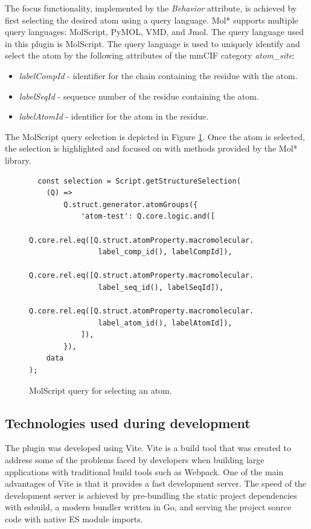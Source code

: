 \documentclass[
  digital,     %
  oneside,     %
  nosansbold,  %
  nocolorbold, %
  lof,         %
  lot,         %
]{fithesis4}
\begin{document}
The focus functionality, implemented by the \textit{Behavior} attribute, is achieved by first selecting the desired atom using a query language. Mol* supports multiple query languages: MolScript, PyMOL, VMD, and Jmol. The query language used in this plugin is MolScript. The query language is used to uniquely identify and select the atom by the following attributes of the mmCIF category \textit{atom\_site}:

\begin{itemize}
  \item \textit{labelCompId} - identifier for the chain containing the residue with the atom.
  \item \textit{labelSeqId} - sequence number of the residue containing the atom.
  \item \textit{labelAtomId} - identifier for the atom in the residue.
\end{itemize}

The MolScript query selection is depicted in Figure \ref{fig:focus}. Once the atom is selected, the selection is highlighted and focused on with methods provided by the Mol* library.

\begin{figure}[htbp]
  \begin{verbatim}
  const selection = Script.getStructureSelection(
    (Q) =>
        Q.struct.generator.atomGroups({
            'atom-test': Q.core.logic.and([
                Q.core.rel.eq([Q.struct.atomProperty.macromolecular.
                label_comp_id(), labelCompId]),
                Q.core.rel.eq([Q.struct.atomProperty.macromolecular.
                label_seq_id(), labelSeqId]),
                Q.core.rel.eq([Q.struct.atomProperty.macromolecular.
                label_atom_id(), labelAtomId]),
            ]),
        }),
    data
);
\end{verbatim}
\caption{MolScript query for selecting an atom.}
\label{fig:focus}
\end{figure}

\subsection{Technologies used during development}

The plugin was developed using Vite. Vite is a build tool that was created to address some of the problems faced by developers when building large applications with traditional build tools such as Webpack. One of the main advantages of Vite is that it provides a fast development server. The speed of the development server is achieved by pre-bundling the static project dependencies with esbuild, a modern bundler written in Go, and serving the project source code with native ES module imports. \cite{vite}
\end{document}
